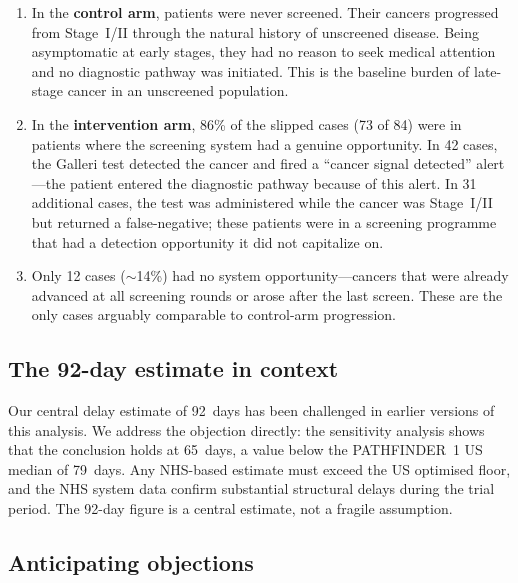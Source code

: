 \documentclass[11pt,letter]{article}
\begin{document}
\begin{enumerate}[nosep]
\item In the \textbf{control arm}, patients were never screened. Their
  cancers progressed from Stage~I/II through the natural history of
  unscreened disease. Being asymptomatic at early stages, they had no
  reason to seek medical attention and no diagnostic pathway was initiated.
  This is the baseline burden of late-stage cancer in an unscreened
  population.

\item In the \textbf{intervention arm}, 86\% of the slipped cases (73 of
  84) were in patients where the screening system had a genuine
  opportunity. In 42 cases, the Galleri test detected the cancer and fired
  a ``cancer signal detected'' alert---the patient entered the diagnostic
  pathway because of this alert. In 31 additional cases, the test was
  administered while the cancer was Stage~I/II but returned a
  false-negative; these patients were in a screening programme that had a
  detection opportunity it did not capitalize on.

\item Only 12 cases (${\sim}$14\%) had no system opportunity---cancers that
  were already advanced at all screening rounds or arose after the last
  screen. These are the only cases arguably comparable to control-arm
  progression.
\end{enumerate}


\subsection{The 92-day estimate in context}

Our central delay estimate of 92~days has been challenged in earlier
versions of this analysis. We address the objection directly: the
sensitivity analysis shows that the conclusion holds at 65~days, a value
below the PATHFINDER~1 US median of 79~days. Any NHS-based estimate must
exceed the US optimised floor, and the NHS system data confirm substantial
structural delays during the trial period. The 92-day figure is a central
estimate, not a fragile assumption.


\subsection{Anticipating objections}
\end{document}
